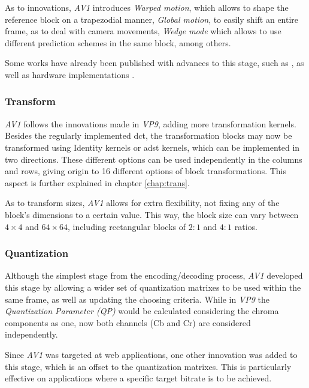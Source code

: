 As to innovations, \emph{AV1} introduces \emph{Warped motion}, which allows to shape the reference block on a trapezodial manner, \emph{Global motion}, to easily shift an entire frame, as to deal with camera movements, \emph{Wedge mode} which allows to use different prediction schemes in the same block, among others.

Some works have already been published with advances to this stage, such as \cite{dengHardwarefriendlyInterPrediction2017}, as well as hardware implementations \cite{domanskiHighThroughputMultifilterInterpolation2019}.

\subsubsection{Transform}

\emph{AV1} follows the innovations made in \emph{VP9}, adding more transformation kernels. Besides the regularly implemented \gls{dct}, the transformation blocks may now be transformed using Identity kernels or \gls{adst} kernels, which can be implemented in two directions. These different options can be used independently in the columns and rows, giving origin to 16 different options of block transformations. This aspect is further explained in chapter \ref{chap:trans}.

As to transform sizes, \emph{AV1} allows for extra flexibility, not fixing any of the block's dimensions to a certain value. This way, the block size can vary between $4 \times 4$ and $64 \times 64$, including rectangular blocks of $2:1$ and $4:1$ ratios.

\subsubsection{Quantization}

Although the simplest stage from the encoding/decoding process, \emph{AV1} developed this stage by allowing a wider set of quantization matrixes to be used within the same frame, as well as updating the choosing criteria. While in \emph{VP9} the \emph{Quantization Parameter (QP)} would be calculated considering the chroma components as one, now both channels (Cb and Cr) are considered independently.

Since \emph{AV1} was targeted at web applications, one other innovation was added to this stage, which is an offset to the quantization matrixes. This is particularly effective on applications where a specific target bitrate is to be achieved.

